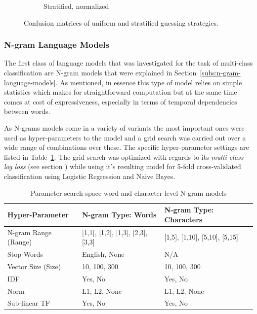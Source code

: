 \begin{figure}[h]
\begin{subfigure}[b]{0.48\textwidth}
        \caption{Stratified, normalized}
      \label{fig:exp-vector-space-conf-matrix-guessing-stratified-normalized}
    \end{subfigure}
    \caption{Confusion matrices of uniform and stratified guessing strategies. }
\label{fig:exp-vector-space-conf-matrix-guessing}
\end{figure}

\subsubsection{N-gram Language Models}

The first class of language models that was investigated for the task of multi-class classification are N-gram models that were explained in Section~\ref{subs:n-gram-language-models}. As mentioned, in essence this type of model relies on simple statistics which makes for straightforward computation but at the same time comes at cost of expressiveness, especially in terms of temporal dependencies between words.

As N-grams models come in a variety of variants the most important ones were used as hyper-parameters to the model and a grid search was carried out over a wide range of combinations over these. The specific hyper-parameter settings are listed in Table~\ref{tab:ngram-parameters}. The grid search was optimized with regards to its \emph{multi-class log loss} (see section ) while using it's resulting model for 5-fold cross-validated classification using Logistic Regression and Naive Bayes.

\begin{center}
  \begin{table}[h]
  \begin{tabular}{ l l l}
    \toprule
    Hyper-Parameter & N-gram Type: Words & N-gram Type: Characters \\
    \midrule
    N-gram Range (Range) & [1,1], [1,2], [1,3], [2,3], [3,3] & [1,5], [1,10], [5,10], [5,15] \\
    Stop Words & English, None & N/A \\
    Vector Size (Size) & 10, 100, 300 & 10, 100, 300 \\
    IDF & Yes, No & Yes, No \\
    Norm & L1, L2, None & L1, L2, None \\
    Sub-linear TF & Yes, No & Yes, No \\
    \bottomrule
  \end{tabular}
  \caption{Parameter search space word and character level N-gram models}
  \label{tab:ngram-parameters}
  \end{table}
\end{center}


